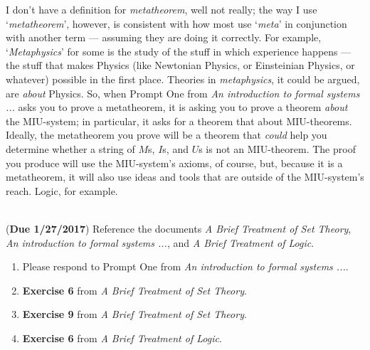 \documentclass[10pt, AMS Euler]{article}
\begin{document}
\begin{enumerate}
I don't have a definition for \emph{metatheorem}, well not really; the way I use `\emph{metatheorem}', however, is consistent with
how most use `\emph{meta}' in conjunction with another term --- assuming they are doing it correctly.  For example, `\emph{Metaphysics}'
for some is the study of the stuff in which experience happens --- the stuff that makes Physics (like Newtonian Physics, or Einsteinian Physics, or whatever)
possible in the first place.  Theories in \emph{metaphysics}, it could be argued, are \emph{about} Physics.
So, when \textsf{Prompt One} from \emph{An introduction to formal systems ...} asks you to prove a metatheorem, it is asking you to prove a theorem
\emph{about} the MIU-system; in particular, it asks for a theorem that about MIU-theorems.  Ideally, the metatheorem you prove will be a theorem that
\emph{could} help you determine whether a string of $M$s, $I$s, and $U$s is not an MIU-theorem.  The proof you produce will use the MIU-system's axioms, of course,
but, because it is a metatheorem, it will also use ideas and tools that are outside of the MIU-system's reach.  Logic, for example.  



\end{enumerate}

\noindent \underline{\hspace{3in}}\\

 ({\bf Due 1/27/2017})  Reference the documents \emph{A Brief Treatment of Set Theory},
\emph{An introduction to formal systems ...}, and \emph{A Brief Treatment of Logic}.

\begin{enumerate}

\item Please respond to \textsf{Prompt One} from \emph{An introduction to formal systems ...}.

\item {\bf Exercise 6} from \emph{A Brief Treatment of Set Theory}.

\item {\bf Exercise 9} from \emph{A Brief Treatment of Set Theory}.

\item {\bf Exercise 6} from \emph{A Brief Treatment of Logic}.


\end{enumerate}

\noindent \underline{\hspace{3in}}\\



\end{document}
